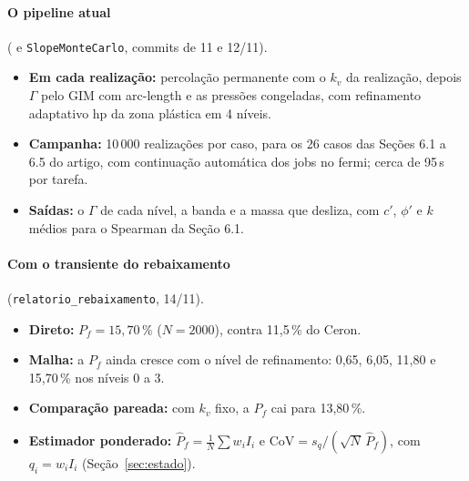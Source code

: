 \paragraph{O pipeline atual} ( e \texttt{SlopeMonteCarlo}, commits de 11 e 12/11).
\begin{itemize}
  \item \textbf{Em cada realização:} percolação permanente com o $k_v$ da realização, depois $\Gamma$ pelo GIM com
    arc-length e as pressões congeladas, com refinamento adaptativo hp da zona plástica em 4 níveis.
  \item \textbf{Campanha:} 10\,000 realizações por caso, para os 26 casos das Seções 6.1 a 6.5 do artigo, com
    continuação automática dos jobs no fermi; cerca de 95\,s por tarefa.
  \item \textbf{Saídas:} o $\Gamma$ de cada nível, a banda e a massa que desliza, com $c'$, $\phi'$ e $k$ médios para o
    Spearman da Seção 6.1.
\end{itemize}

\paragraph{Com o transiente do rebaixamento} (\texttt{relatorio\_rebaixamento}, 14/11).
\begin{itemize}
  \item \textbf{Direto:} $P_f = 15{,}70\,\%$ ($N = 2000$), contra 11,5\,\% do Ceron.
  \item \textbf{Malha:} a $P_f$ ainda cresce com o nível de refinamento: 0,65, 6,05, 11,80 e 15,70\,\% nos níveis 0
    a 3.
  \item \textbf{Comparação pareada:} com $k_v$ fixo, a $P_f$ cai para 13,80\,\%.
  \item \textbf{Estimador ponderado:} $\hat P_f = \frac1N\sum w_iI_i$ e $\mathrm{CoV} = s_q/(\sqrt N\,\hat P_f)$, com
    $q_i = w_iI_i$ (Seção~\ref{sec:estado}).
\end{itemize}
